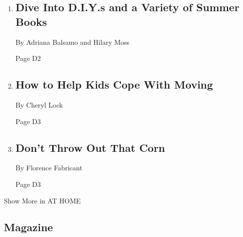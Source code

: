 \begin{enumerate}
\def\labelenumi{\arabic{enumi}.}
\item
  \href{/2020/07/25/at-home/coronavirus-things-to-do-at-home.html}{}

  \hypertarget{dive-into-diys-and-a-variety-of-summer-books}{%
  \subsection{Dive Into D.I.Y.s and a Variety of Summer
  Books}\label{dive-into-diys-and-a-variety-of-summer-books}}

  By Adriana Balsamo and Hilary Moss

  Page D2
\item
  \href{/2020/07/13/parenting/moving-tips-kids.html}{}

  \hypertarget{how-to-help-kids-cope-with-moving}{%
  \subsection{How to Help Kids Cope With
  Moving}\label{how-to-help-kids-cope-with-moving}}

  By Cheryl Lock

  Page D3
\item
  \href{/2020/07/25/at-home/coronavirus-corn-ideas.html}{}

  \hypertarget{dont-throw-out-that-corn}{%
  \subsection{Don't Throw Out That
  Corn}\label{dont-throw-out-that-corn}}

  By Florence Fabricant

  Page D3
\end{enumerate}

Show More in AT HOME

\hypertarget{magazine}{%
\subsection{Magazine}\label{magazine}}

